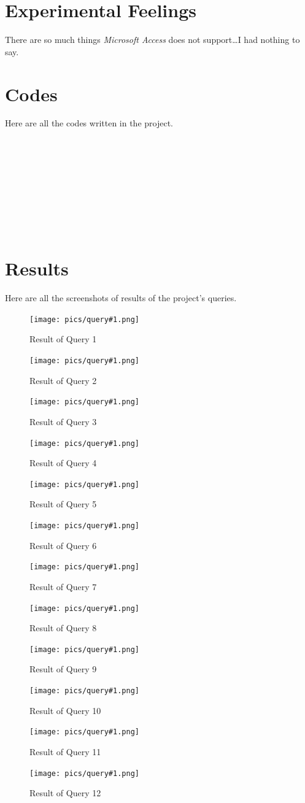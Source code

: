 \documentclass[scheme=plain,12pt]{ctexart}
\newcommand{\src}[1]{
    
    \begin{listing}[hp]
        \centering
        \inputminted[bgcolor=codebg,autogobble,linenos=true,breaklines]{sql}{src/query#1.sql}
        \caption{Code of Query #1}
        \label{lst:query-#1}
    \end{listing}

}
\newcommand{\pic}[1]{
    
    \begin{figure}[hp]
        \centering
        \texttt{[image: pics/query\#1.png]}
        \caption{Result of Query #1}
        \label{fig:query-#1}
    \end{figure}

}
\begin{document}
    \section{Experimental Feelings}

    There are so much things \textit{Microsoft Access} does not support\dots I had nothing to say.

    \section{Codes}

    Here are all the codes written in the project.

    \listoflistings

    \src{1}
    \src{2}
    \src{3}
    \src{4}
    \src{5}
    \src{6}
    \src{7}
    \src{8}
    \src{9}
    \src{10}
    \src{11}
    \src{12}

    \clearpage
    
    \section{Results}

    Here are all the screenshots of results of the project's queries.

    \listoffigures

    \pic{1}
    \pic{2}
    \pic{3}
    \pic{4}
    \pic{5}
    \pic{6}
    \pic{7}
    \pic{8}
    \pic{9}
    \pic{10}
    \pic{11}
    \pic{12}
\end{document}
